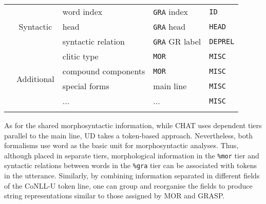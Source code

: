 \begin{table}[h!]
\begin{tabularx}{\widefigurewidth}{@{}lcXll@{}}
\multicolumn{1}{l}{\multirow{11}{*}{}}&\multicolumn{1}{c}{\multirow{3}{*}{Syntactic}}& word index      & \texttt{GRA} index& \texttt{ID}\\
\multicolumn{1}{l}{\multirow{11}{*}{}}&\multicolumn{1}{c}{\multirow{3}{*}{}}& head            & \texttt{GRA} head& \texttt{HEAD}\\
\multicolumn{1}{l}{\multirow{11}{*}{}}&\multicolumn{1}{c}{\multirow{3}{*}{}}& syntactic relation  & \texttt{GRA} GR label& \texttt{DEPREL}\\\addlinespace
\multicolumn{1}{l}{\multirow{11}{*}{}}&\multicolumn{1}{c}{\multirow{4}{*}{Additional}}& clitic type      & \texttt{MOR} & \texttt{MISC}\\
\multicolumn{1}{l}{\multirow{11}{*}{}}&\multicolumn{1}{c}{\multirow{4}{*}{}}& compound components  & \texttt{MOR} & \texttt{MISC}\\
\multicolumn{1}{l}{\multirow{11}{*}{}}&\multicolumn{1}{c}{\multirow{4}{*}{}}& special forms     & main line & \texttt{MISC}\\
\multicolumn{1}{l}{\multirow{11}{*}{}}&\multicolumn{1}{c}{\multirow{4}{*}{}}& ...              & ... & \texttt{MISC}\\\addlinespace
\bottomrule
\end{tabularx}
\end{table}

As for the shared morphosyntactic information, while CHAT uses dependent tiers parallel to the main line, UD takes a token-based approach. Nevertheless, both formalisms use word as the basic unit for morphosyntactic analyses. Thus, although placed in separate tiers, morphological information in the \texttt{\%mor} tier and syntactic relations between words in the \texttt{\%gra} tier can be associated with tokens in the utterance. Similarly, by combining information separated in different fields of the CoNLL-U token line, one can group and reorganise the fields to produce string representations similar to those assigned by MOR and GRASP.
